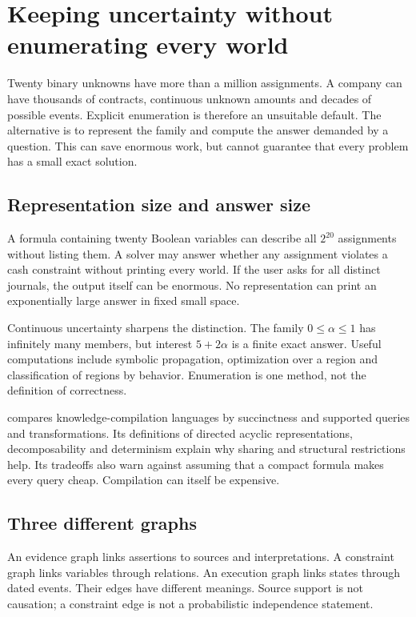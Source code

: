 \chapter[Compact uncertainty]{Keeping uncertainty without enumerating every world}
\label{sim:compression}

Twenty binary unknowns have more than a million assignments. A company can have thousands of contracts, continuous unknown amounts and decades of possible events. Explicit enumeration is therefore an unsuitable default. The alternative is to represent the family and compute the answer demanded by a question. This can save enormous work, but cannot guarantee that every problem has a small exact solution.

\section{Representation size and answer size}
A formula containing twenty Boolean variables can describe all $2^{20}$ assignments without listing them. A solver may answer whether any assignment violates a cash constraint without printing every world. If the user asks for all distinct journals, the output itself can be enormous. No representation can print an exponentially large answer in fixed small space.

Continuous uncertainty sharpens the distinction. The family $0\leq\alpha\leq1$ has infinitely many members, but interest $5+2\alpha$ is a finite exact answer. Useful computations include symbolic propagation, optimization over a region and classification of regions by behavior. Enumeration is one method, not the definition of correctness.

\citet{darwiche2002} compares knowledge-compilation languages by succinctness and supported queries and transformations. Its definitions of directed acyclic representations, decomposability and determinism explain why sharing and structural restrictions help. Its tradeoffs also warn against assuming that a compact formula makes every query cheap. Compilation can itself be expensive.

\section{Three different graphs}
An evidence graph links assertions to sources and interpretations. A constraint graph links variables through relations. An execution graph links states through dated events. Their edges have different meanings. Source support is not causation; a constraint edge is not a probabilistic independence statement.

